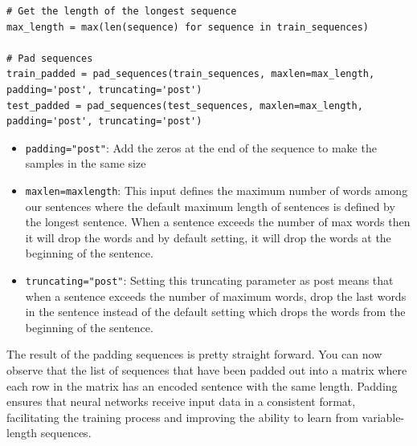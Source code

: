 \begin{lstlisting}
# Get the length of the longest sequence
max_length = max(len(sequence) for sequence in train_sequences)
	
# Pad sequences
train_padded = pad_sequences(train_sequences, maxlen=max_length, padding='post', truncating='post')
test_padded = pad_sequences(test_sequences, maxlen=max_length, padding='post', truncating='post')
\end{lstlisting}

\begin{itemize}
	\item \verb*|padding="post"|: Add the zeros at the end of the sequence to make the samples in the same size
	
	\item \verb*|maxlen=maxlength|: This input defines the maximum number of words among our sentences where the default maximum length of sentences is defined by the longest sentence. When a sentence exceeds the number of max words then it will drop the words and by default setting, it will drop the words at the beginning of the sentence.
	
	\item \verb*|truncating="post"|: Setting this truncating parameter as post means that when a sentence exceeds the number of maximum words, drop the last words in the sentence instead of the default setting which drops the words from the beginning of the sentence.
\end{itemize}

The result of the padding sequences is pretty straight forward. You can now observe that the list of sequences that have been padded out into a matrix where each row in the matrix has an encoded sentence with the same length. Padding ensures that neural networks receive input data in a consistent format, facilitating the training process and improving the ability to learn from variable-length sequences.







